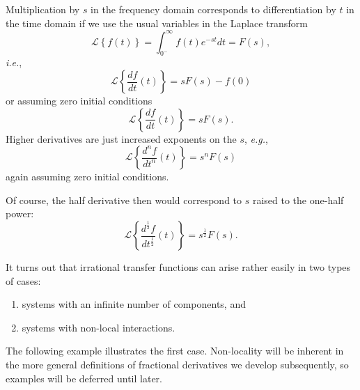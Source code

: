 Multiplication by $s$ in the frequency domain corresponds to differentiation by $t$ in the time domain if we use the
usual variables in the Laplace transform
\begin{equation}
  \mathcal{L} \left\{ f(t) \right\} = \int_{0^-}^\infty f(t) e^{-s t} dt = F(s),
\end{equation}
\textit{i.e.}, 
\begin{equation}
  \mathcal L \left\{ \frac{df}{dt}(t) \right\} = s F(s) - f(0)
\end{equation}
or assuming zero initial conditions
\begin{equation}
  \mathcal L \left\{ \frac{df}{dt}(t) \right\} = s F(s).
\end{equation}
Higher derivatives are just increased exponents on the $s$, \textit{e.g.}, 
\begin{equation}
  \mathcal L \left\{ \frac{d^n f}{dt^n}(t) \right\} = s^n F(s)
\end{equation}
again assuming zero initial conditions.

Of course, the half derivative then would correspond to $s$ raised to the one-half power:
\begin{equation}
  \mathcal L \left\{ \frac{d^\frac{1}{2} f}{d t^\frac{1}{2}}(t) \right\} = s^\frac{1}{2} F(s).
\end{equation}

It turns out that irrational transfer functions can arise rather easily in two types of cases:
\begin{enumerate}
  \item systems with an infinite number of components, and
  \item systems with non-local interactions.
\end{enumerate}
The following example illustrates the first case. Non-locality will be inherent in the more general definitions of fractional derivatives we develop subsequently, so examples will be deferred until later.

